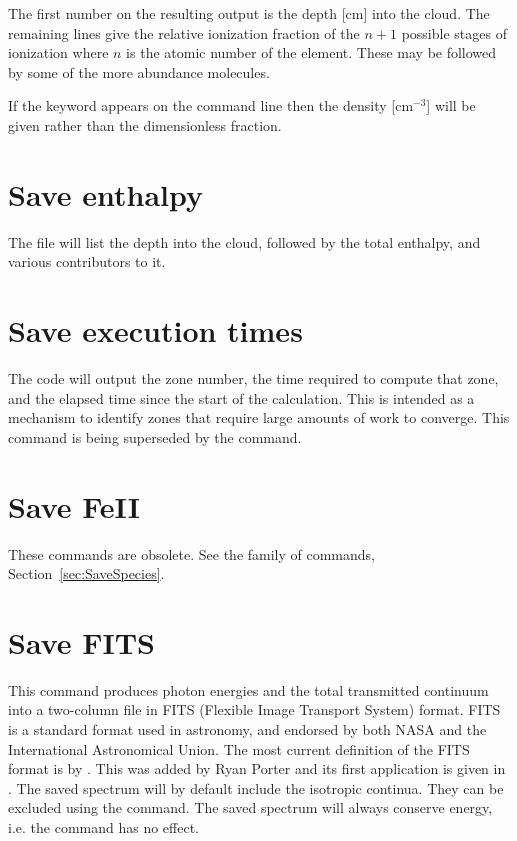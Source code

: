 The first number on the resulting output is the depth [cm] into the cloud.
The remaining lines give the relative ionization fraction of the $n+1$ possible
stages of ionization where $n$ is the atomic number of the element.  These
may be followed by some of the more abundance molecules.

If the keyword  appears on the command line then the
density [cm$^{-3}$]
will be given rather than the dimensionless fraction.

\section{Save enthalpy}

The file will list the depth into the cloud, followed by the total
enthalpy, and various contributors to it.

\section{Save execution times}

The code will output the zone number, the time required to compute that
zone, and the elapsed time since the start of the calculation.  This is
intended as a mechanism to identify zones that require large amounts of
work to converge.  
This command is being superseded by the  command.

\section{Save FeII}
\label{sec:CommandSaveFeII}

These commands are obsolete.
See the  family of commands,
Section~\ref{sec:SaveSpecies}.

\section{Save FITS}

This command produces photon energies and the total transmitted continuum into
a two-column file in FITS (Flexible Image Transport System) format.  FITS
is a standard format used in astronomy, and endorsed by both NASA and the
International Astronomical Union.  The most current definition of the FITS
format is by \citet{Hanisch2001}.  This was added by Ryan Porter and its
first application is given in \citet{Porter2006}.  The saved spectrum will
by default include the isotropic continua.  They can be excluded using the
 command.  The saved spectrum will
always conserve energy, i.e. the  command
has no effect.

